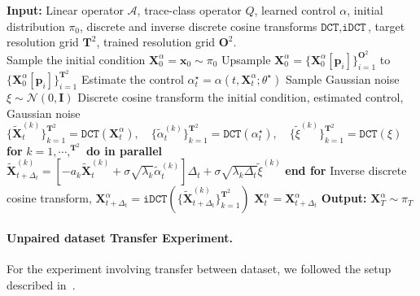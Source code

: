 \documentclass[nohyperref]{article}
\theoremstyle{plain}
\theoremstyle{remark}
\newcommand{\mc}{\mathcal}
\newcommand{\mb}{\mathbf}
\begin{document}
 \begin{algorithm}[t!]
    \caption{DBFS sampling for Bridge Matching}
    \begin{algorithmic}\label{algorithm:DBFS sampling}
    \STATE \textbf{Input:} Linear operator $\mc{A}$, trace-class operator $Q$, learned control $\alpha$, initial distribution $\pi_0$, discrete and inverse discrete cosine transforms $\texttt{DCT}, \texttt{iDCT}$, target resolution grid $\mb{T}^2$, trained resolution grid $\mb{O}^2$.
    \\\hrulefill
    \STATE Sample the initial condition $\mb{X}^{\alpha}_0 = \mb{x}_0 \sim \pi_0$
        \IF{$\mb{T}^2 \neq \mb{O}^2$}
        \STATE Upsample $\mb{X}^{\alpha}_0 = \{\mb{X}^{\alpha}_0[\mb{p}_i]\}_{i=1}^{\mb{O}^2}$ to $\{\mb{X}^{\alpha}_0[\mb{p}_i]\}_{i=1}^{\mb{T}^2}$
        \ENDIF
        \STATE Estimate the control $\alpha^{\star}_t = \alpha(t, \mb{X}^{\alpha}_t;\theta^{\star})$
        \STATE Sample Gaussian noise $\xi \sim \mc{N}(0, \mb{I})$
        \STATE Discrete cosine transform the initial condition, estimated control, Gaussian noise
        \STATE $\{\tilde{\mb{X}}_t^{(k)}\}_{k=1}^{\mb{T}^2} = \texttt{DCT}(\mb{X}^{\alpha}_t), \quad \{\tilde{\alpha}^{(k)}_t\}_{k=1}^{\mb{T}^2} = \texttt{DCT}(\alpha^{\star}_t), \quad \{\tilde{\xi}^{(k)}\}_{k=1}^{\mb{T}^2} = \texttt{DCT}(\xi)$
        \STATE \textbf{for} $k=1, \cdots, ^{\mb{T}^2}$ \textbf{do in parallel}
        \STATE\hspace{+4mm} $\tilde{\mb{X}}_{t+\Delta_t}^{(k)}= \left[- a_k  \tilde{\mb{X}}_{t}^{(k)} + \sigma \sqrt{\lambda_k} \tilde{\alpha}^{(k)}_t\right] \Delta_t + \sigma \sqrt{\lambda_k \Delta_t}  \tilde{\xi}^{(k)} $ 
        \STATE \textbf{end for}
        \STATE Inverse discrete cosine transform, $\mb{X}^{\alpha}_{t+\Delta_t} = \texttt{iDCT}(\{\tilde{\mb{X}}_{t+\Delta_t}^{(k)}\}_{k=1}^{\mb{T}^2})$
        \STATE $\mb{X}^{\alpha}_t = \mb{X}^{\alpha}_{t+\Delta_t}$
      \ENDFOR
    \STATE \textbf{Output:} $\mb{X}^{\alpha}_T \sim \pi_T$
    \end{algorithmic}
  \end{algorithm}





\paragraph{Unpaired dataset Transfer Experiment. } 

For the experiment involving transfer between dataset, we followed the setup described in~\citep{peluchetti2023diffusion}. 
\end{document}
